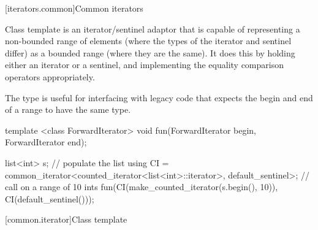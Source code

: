 [iterators.common]{Common iterators}

\pnum
Class template  is an iterator/sentinel adaptor that is
capable of representing a non-bounded range of elements (where the types of the
iterator and sentinel differ) as a bounded range (where they are the same). It
does this by holding either an iterator or a sentinel, and implementing the
equality comparison operators appropriately.

\pnum
\enternote The  type is useful for interfacing with legacy
code that expects the begin and end of a range to have the same type.\exitnote

\pnum
\enterexample
\begin{codeblock}
template <class ForwardIterator>
void fun(ForwardIterator begin, ForwardIterator end);

list<int> s;
// populate the list 
using CI =
  common_iterator<counted_iterator<list<int>::iterator>,
                  default_sentinel>;
// call  on a range of 10 ints
fun(CI(make_counted_iterator(s.begin(), 10)),
    CI(default_sentinel()));
\end{codeblock}
\exitexample

[common.iterator]{Class template }

